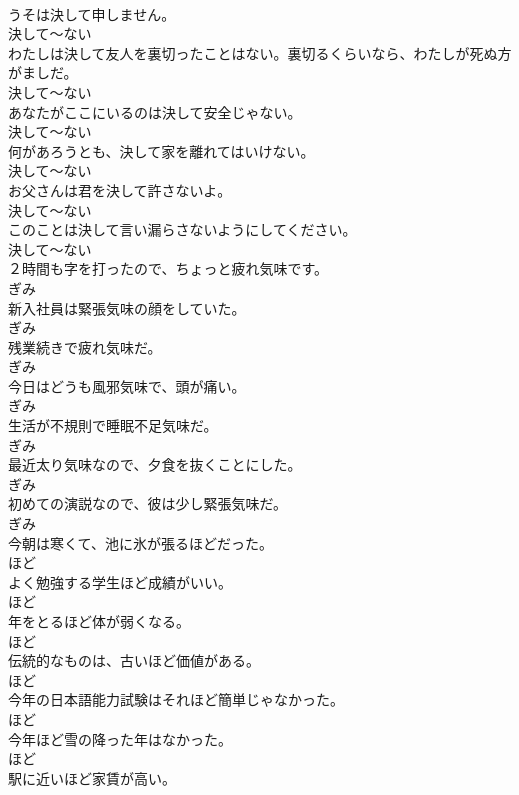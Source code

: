\documentclass[8pt]{extreport}
\begin{document}
\begin{CJK}{UTF8}{min}
\\	うそは決して申しません。	
\\	決して～ない	
\\	わたしは決して友人を裏切ったことはない。裏切るくらいなら、わたしが死ぬ方がましだ。	
\\	決して～ない	
\\	あなたがここにいるのは決して安全じゃない。	
\\	決して～ない	
\\	何があろうとも、決して家を離れてはいけない。	
\\	決して～ない	
\\	お父さんは君を決して許さないよ。	
\\	決して～ない	
\\	このことは決して言い漏らさないようにしてください。	
\\	決して～ない	
\\	２時間も字を打ったので、ちょっと疲れ気味です。	
\\	ぎみ	
\\	新入社員は緊張気味の顔をしていた。	
\\	ぎみ	
\\	残業続きで疲れ気味だ。	
\\	ぎみ	
\\	今日はどうも風邪気味で、頭が痛い。	
\\	ぎみ	
\\	生活が不規則で睡眠不足気味だ。	
\\	ぎみ	
\\	最近太り気味なので、夕食を抜くことにした。	
\\	ぎみ	
\\	初めての演説なので、彼は少し緊張気味だ。	
\\	ぎみ	
\\	今朝は寒くて、池に氷が張るほどだった。	
\\	ほど	
\\	よく勉強する学生ほど成績がいい。	
\\	ほど	
\\	年をとるほど体が弱くなる。	
\\	ほど	
\\	伝統的なものは、古いほど価値がある。	
\\	ほど	
\\	今年の日本語能力試験はそれほど簡単じゃなかった。	
\\	ほど	
\\	今年ほど雪の降った年はなかった。	
\\	ほど	
\\	駅に近いほど家賃が高い。	

\end{CJK}
\end{document}
